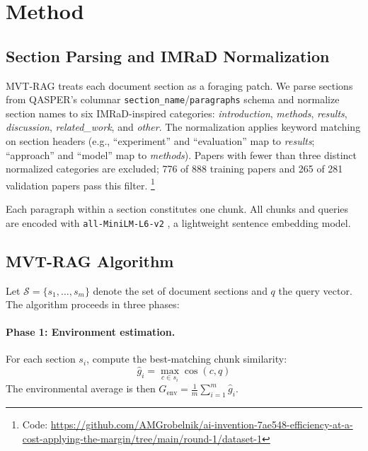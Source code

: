 \documentclass[11pt,letterpaper]{article}
\begin{document}
\section{Method}

\subsection{Section Parsing and IMRaD Normalization}

MVT-RAG treats each document section as a foraging patch. We parse sections from QASPER's columnar
\texttt{section\_name}/\texttt{paragraphs} schema and normalize section names to six IMRaD-inspired categories:
\emph{introduction}, \emph{methods}, \emph{results}, \emph{discussion}, \emph{related\_work}, and \emph{other}. The
normalization applies keyword matching on section headers (e.g., ``experiment'' and ``evaluation'' map to \emph{results};
``approach'' and ``model'' map to \emph{methods}). Papers with fewer than three distinct normalized categories are
excluded; 776 of 888 training papers and 265 of 281 validation papers pass this filter.%
\footnote{Code: \url{https://github.com/AMGrobelnik/ai-invention-7ae548-efficiency-at-a-cost-applying-the-margin/tree/main/round-1/dataset-1}}

Each paragraph within a section constitutes one chunk. All chunks and queries are encoded with
\texttt{all-MiniLM-L6-v2} \citep{Reimers2019}, a lightweight sentence embedding model.

\subsection{MVT-RAG Algorithm}

Let $\mathcal{S} = \{s_1, \ldots, s_m\}$ denote the set of document sections and $q$ the query vector. The algorithm
proceeds in three phases:

\paragraph{Phase 1: Environment estimation.} For each section $s_i$, compute the best-matching chunk similarity:
\begin{equation}
  \hat{g}_i = \max_{c \in s_i} \cos(c, q)
\end{equation}
The environmental average is then $G_{\mathrm{env}} = \frac{1}{m} \sum_{i=1}^{m} \hat{g}_i$.
\end{document}
